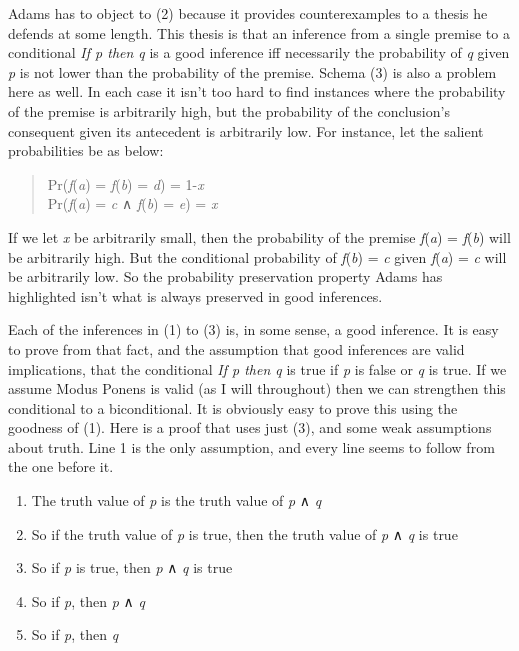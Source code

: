 \documentclass[
  10pt,
  letterpaper,
  DIV=11,
  numbers=noendperiod,
  twoside]{scrartcl}
\providecommand{\tightlist}{%
  \setlength{\itemsep}{0pt}\setlength{\parskip}{0pt}}\usepackage{longtable,booktabs,array}
\begin{document}
Adams has to object to (2) because it provides counterexamples to a
thesis he defends at some length. This thesis is that an inference from
a single premise to a conditional \emph{If p then q} is a good inference
iff necessarily the probability of \emph{q} given \emph{p} is not lower
than the probability of the premise. Schema (3) is also a problem here
as well. In each case it isn't too hard to find instances where the
probability of the premise is arbitrarily high, but the probability of
the conclusion's consequent given its antecedent is arbitrarily low. For
instance, let the salient probabilities be as below:

\begin{quote}
Pr(\emph{f}(\emph{a}) = \emph{f}(\emph{b}) = \emph{d}) = 1-\emph{x}\\
Pr(\emph{f}(\emph{a}) = \emph{c} ∧ \emph{f}(\emph{b}) = \emph{e}) =
\emph{x}
\end{quote}

If we let \emph{x} be arbitrarily small, then the probability of the
premise \emph{f}(\emph{a}) = \emph{f}(\emph{b}) will be arbitrarily
high. But the conditional probability of \emph{f}(\emph{b}) = \emph{c}
given \emph{f}(\emph{a}) = \emph{c} will be arbitrarily low. So the
probability preservation property Adams has highlighted isn't what is
always preserved in good inferences.

Each of the inferences in (1) to (3) is, in some sense, a good
inference. It is easy to prove from that fact, and the assumption that
good inferences are valid implications, that the conditional \emph{If p
then q} is true if \emph{p} is false or \emph{q} is true. If we assume
Modus Ponens is valid (as I will throughout) then we can strengthen this
conditional to a biconditional. It is obviously easy to prove this using
the goodness of (1). Here is a proof that uses just (3), and some weak
assumptions about truth. Line 1 is the only assumption, and every line
seems to follow from the one before it.

\begin{enumerate}
\def\labelenumi{\arabic{enumi}.}
\tightlist
\item
  The truth value of \emph{p} is the truth value of \emph{p} ∧ \emph{q}
\item
  So if the truth value of \emph{p} is true, then the truth value of
  \emph{p} ∧ \emph{q} is true
\item
  So if \emph{p} is true, then \emph{p} ∧ \emph{q} is true
\item
  So if \emph{p}, then \emph{p} ∧ \emph{q}
\item
  So if \emph{p}, then \emph{q}
\end{enumerate}
\end{document}
